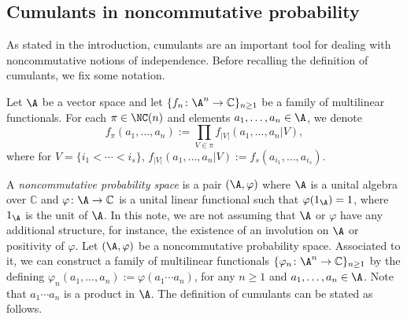 \subsection{Cumulants in noncommutative probability}\label{sec:cumulants}

As stated in the introduction, cumulants are an important tool for dealing with noncommutative notions of independence. Before recalling the definition of cumulants, we fix some notation.
\begin{Definition}
 Let $\A$ be a vector space and let $\{f_n\colon \A^n \to \mathbb{C}\}_{n\geq1}$ be a family of multilinear functionals. For each $\pi \in \NC(n)$ and elements $a_1,\dots,a_n \in \A$, we denote{\samepage
\[
	f_{\pi}(a_1,\dots,a_n) := \prod_{V \in \pi} f_{|V|}(a_1,\dots,a_n | V),
\]
where for $V = \{i_1 < \cdots < i_s\}$, $f_{|V|}(a_1,\dots,a_n|V) := f_s(a_{i_1},\dots,a_{i_s})$.}
\end{Definition}
A \textit{noncommutative probability space} is a pair $(\A,\varphi)$ where $\A$ is a unital algebra over $\mathbb{C}$ and $\varphi\colon \A\to \mathbb{C}$ is a unital linear functional such that $\varphi(1_\A)=1$, where $1_\A$ is the unit of $\A$. In this note, we are not assuming that $\A$ or $\varphi$ have any additional structure, for instance, the existence of an involution on $\A$ or positivity of $\varphi$.
Let $(\A,\varphi)$ be a noncommutative probability space. Associated to it, we can construct a family of multilinear functionals $\{\varphi_n\colon \A^n\to\mathbb{C}\}_{n\geq 1}$ by the defining $\varphi_n(a_1,\dots,a_n) := \varphi(a_1\cdots a_n)$, for any $n\geq1$ and $a_1,\dots,a_n\in \A$. Note that $a_1\cdots a_n$ is a product in $\A$. The definition of cumulants can be stated as follows.

